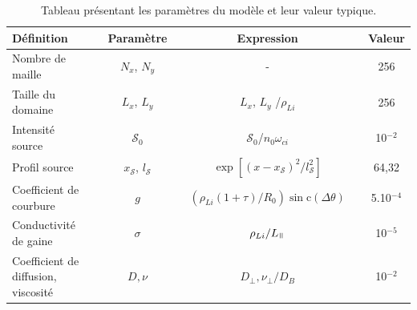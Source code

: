\begin{refsection}
\begin{table}[!htbp]
\footnotesize\centering
{}
\begin{tabular}{@{}lcccccc@{}}\toprule
Définition&&Paramètre&&Expression&&Valeur\\
\midrule 
Nombre de maille&&$N_x$, $N_y$ && - && 256\\
Taille du domaine&&$L_x$, $L_y$ &&$L_x$, $L_y$ /$\rho_{Li}$ && 256\\
Intensité source&&$\mathcal{S}_0$ &&
$\mathcal{S}_0$/$n_0\omega_{ci}$
&& 10$^{-2}$\\
Profil source&& $x_\mathcal{S}$,
$l_\mathcal{S}$ && $\exp[(x-x_\mathcal{S})^2/l_\mathcal{S}^2]$
&& 64,32\\
Coefficient de courbure&&$g$ &&
$(\rho_{Li}(1+\tau)/R_0)\sin\text{c}(\Delta\theta)$\footnotemark &&
5.10$^{-4}$\\
Conductivité de gaine&&$\sigma$ &&
$\rho_{Li}/L_\para$ &&
10$^{-5}$\\
Coefficient de diffusion, viscosité&&$D,\nu$ &&
$D_\perp,\nu_\perp/D_B$ &&
10$^{-2}$\\
\bottomrule
\end{tabular}
\caption{Tableau présentant les paramètres du modèle et
leur valeur typique.}\label{2-TokamParam}
\end{table}


\end{refsection}
